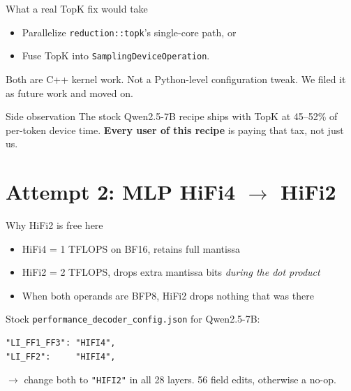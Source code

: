 \documentclass[aspectratio=169,10pt]{beamer}
\begin{document}
\begin{frame}{What a real TopK fix would take}
  \begin{itemize}
    \item Parallelize \texttt{reduction::topk}'s single-core path, or
    \item Fuse TopK into \texttt{SamplingDeviceOperation}.
  \end{itemize}
  \vfill
  Both are C++ kernel work. Not a Python-level configuration tweak.
  We filed it as future work and moved on.
  \vfill
  \begin{alertblock}{Side observation}
    The stock Qwen2.5-7B recipe ships with TopK at 45--52\% of per-token
    device time. \textbf{Every user of this recipe} is paying that tax,
    not just us.
  \end{alertblock}
\end{frame}

\section{Attempt 2: MLP HiFi4 $\to$ HiFi2}

\begin{frame}[fragile]{Why HiFi2 is free here}
  \begin{itemize}
    \item HiFi4 = 1 TFLOPS on BF16, retains full mantissa
    \item HiFi2 = 2 TFLOPS, drops extra mantissa bits \emph{during the dot product}
    \item When both operands are BFP8, HiFi2 drops nothing that was there
  \end{itemize}
  \vfill
  Stock \texttt{performance\_decoder\_config.json} for Qwen2.5-7B:
\begin{lstlisting}
"LI_FF1_FF3": "HIFI4",
"LI_FF2":     "HIFI4",
\end{lstlisting}
  $\rightarrow$ change both to \texttt{"HIFI2"} in all 28 layers. 56 field edits, otherwise a no-op.
\end{frame}
\end{document}
